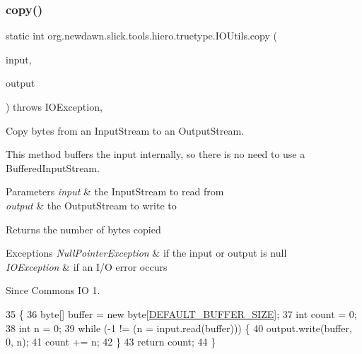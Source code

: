 \subsubsection{\texorpdfstring{copy()}{copy()}}
{\footnotesize\ttfamily static int org.\+newdawn.\+slick.\+tools.\+hiero.\+truetype.\+I\+O\+Utils.\+copy (\begin{DoxyParamCaption}\item[{Input\+Stream}]{input,  }\item[{Output\+Stream}]{output }\end{DoxyParamCaption}) throws I\+O\+Exception\hspace{0.3cm}{\ttfamily [inline]}, {\ttfamily [static]}}

Copy bytes from an {\ttfamily Input\+Stream} to an {\ttfamily Output\+Stream}. 

This method buffers the input internally, so there is no need to use a {\ttfamily Buffered\+Input\+Stream}.


\begin{DoxyParams}{Parameters}
{\em input} & the {\ttfamily Input\+Stream} to read from \\
\hline
{\em output} & the {\ttfamily Output\+Stream} to write to \\
\hline
\end{DoxyParams}
\begin{DoxyReturn}{Returns}
the number of bytes copied 
\end{DoxyReturn}

\begin{DoxyExceptions}{Exceptions}
{\em Null\+Pointer\+Exception} & if the input or output is null \\
\hline
{\em I\+O\+Exception} & if an I/O error occurs \\
\hline
\end{DoxyExceptions}
\begin{DoxySince}{Since}
Commons IO 1. 
\end{DoxySince}

\begin{DoxyCode}
35                                \{
36         byte[] buffer = \textcolor{keyword}{new} byte[\mbox{\hyperlink{classorg_1_1newdawn_1_1slick_1_1tools_1_1hiero_1_1truetype_1_1_i_o_utils_a7d591bed6c62c8cbf595d86223ffe25f}{DEFAULT\_BUFFER\_SIZE}}];
37         \textcolor{keywordtype}{int} count = 0;
38         \textcolor{keywordtype}{int} n = 0;
39         \textcolor{keywordflow}{while} (-1 != (n = input.read(buffer))) \{
40             output.write(buffer, 0, n);
41             count += n;
42         \}
43         \textcolor{keywordflow}{return} count;
44     \}
\end{DoxyCode}
\mbox{\label{classorg_1_1newdawn_1_1slick_1_1tools_1_1hiero_1_1truetype_1_1_i_o_utils_a4495b47b8758850ade00d36fd0ae06c0}} 
